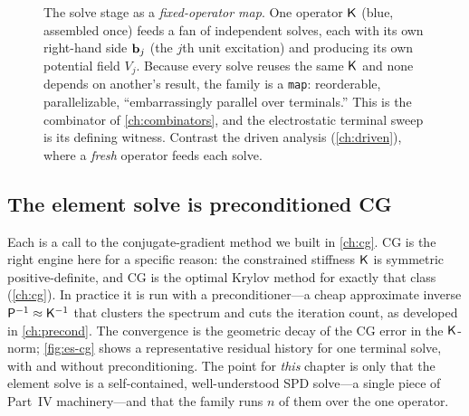 \begin{figure}[t]
\centering
{}
\caption[ as a fixed-operator map]{The solve stage as a
\emph{fixed-operator map}. One operator $\mathsf{K}$ (blue, assembled once) feeds a fan
of independent solves, each with its own right-hand side $\mathbf{b}_j$ (the $j$th unit
excitation) and producing its own potential field $V_j$. Because every solve
reuses the same $\mathsf{K}$ and none depends on another's result, the family is a
\texttt{map}: reorderable, parallelizable, ``embarrassingly parallel over
terminals.'' This is the combinator  of \cref{ch:combinators},
and the electrostatic terminal sweep is its defining witness. Contrast the driven
analysis (\cref{ch:driven}), where a \emph{fresh} operator feeds each solve.}
\label{fig:es-solvefamily}
\end{figure}

\subsection{The element solve is preconditioned CG}

Each  is a call to the conjugate-gradient method we built in
\cref{ch:cg}. CG is the right engine here for a specific reason: the constrained
stiffness $\mathsf{K}$ is symmetric positive-definite, and CG is the optimal Krylov
method for exactly that class (\cref{ch:cg}). In practice it is run with a
preconditioner---a cheap approximate inverse $\mathsf{P}^{-1}\approx\mathsf{K}^{-1}$ that
clusters the spectrum and cuts the iteration count, as developed in
\cref{ch:precond}. The convergence is the geometric decay of the CG error in the
$\mathsf{K}$-norm; \cref{fig:es-cg} shows a representative residual history for one
terminal solve, with and without preconditioning. The point for \emph{this} chapter
is only that the element solve is a self-contained, well-understood SPD solve---a
single piece of Part~IV machinery---and that the family runs $n$ of them over the
one operator.

